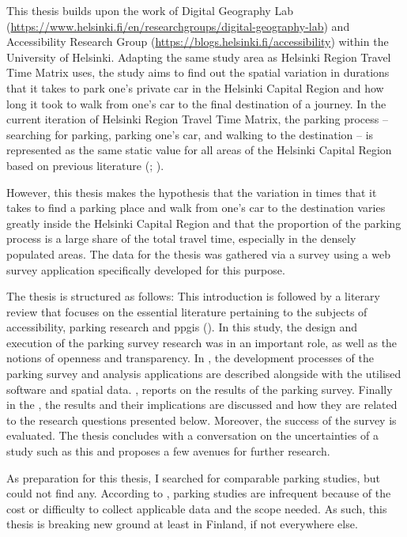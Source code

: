 This thesis builds upon the work of Digital Geography Lab (\textcolor{blue}{\url{https://www.helsinki.fi/en/researchgroups/digital-geography-lab}}) and Accessibility Research Group (\textcolor{blue}{\url{https://blogs.helsinki.fi/accessibility}}) within the University of Helsinki. Adapting the same study area as Helsinki Region Travel Time Matrix uses, the study aims to find out the spatial variation in durations that it takes to park one's private car in the Helsinki Capital Region and how long it took to walk from one's car to the final destination of a journey. In the current iteration of Helsinki Region Travel Time Matrix, the parking process -- searching for parking, parking one's car, and walking to the destination -- is represented as the same static value for all areas of the Helsinki Capital Region based on previous literature (\cite{Tenkanen2020}; \cite{Kalenoja2003}).

However, this thesis makes the hypothesis that the variation in times that it takes to find a parking place and walk from one's car to the destination varies greatly inside the Helsinki Capital Region and that the proportion of the parking process is a large share of the total travel time, especially in the densely populated areas. The data for the thesis was gathered via a survey using a web survey application specifically developed for this purpose.

The thesis is structured as follows: This introduction is followed by a literary review that focuses on the essential literature pertaining to the subjects of accessibility, parking research and \acrlong{ppgis} (\hyperref[sec:c2-background]{}). In this study, the design and execution of the parking survey research was in an important role, as well as the notions of openness and transparency. In \hyperref[sec:c3-data]{}, the development processes of the parking survey and analysis applications are described alongside with the utilised software and spatial data. \hyperref[sec:c4-results]{}, reports on the results of the parking survey. Finally in the \hyperref[sec:c5-discussion]{}, the results and their implications are discussed and how they are related to the research questions presented below. Moreover, the success of the survey is evaluated. The thesis concludes with a conversation on the uncertainties of a study such as this and proposes a few avenues for further research.

As preparation for this thesis, I searched for comparable parking studies, but could not find any. According to , parking studies are infrequent because of the cost or difficulty to collect applicable data and the scope needed. As such, this thesis is breaking new ground at least in Finland, if not everywhere else.

